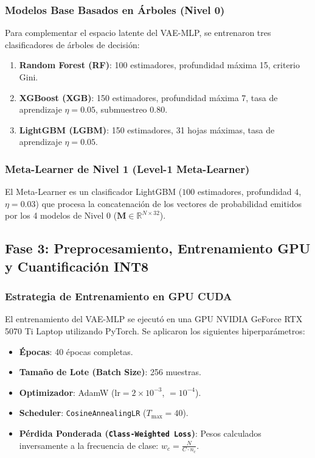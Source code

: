 \subsubsection{Modelos Base Basados en Árboles (Nivel 0)}
Para complementar el espacio latente del VAE-MLP, se entrenaron tres clasificadores de árboles de decisión:
\begin{enumerate}
    \item \textbf{Random Forest (RF)}: 100 estimadores, profundidad máxima 15, criterio Gini.
    \item \textbf{XGBoost (XGB)}: 150 estimadores, profundidad máxima 7, tasa de aprendizaje $\eta = 0.05$, submuestreo $0.80$.
    \item \textbf{LightGBM (LGBM)}: 150 estimadores, 31 hojas máximas, tasa de aprendizaje $\eta = 0.05$.
\end{enumerate}

\subsubsection{Meta-Learner de Nivel 1 (Level-1 Meta-Learner)}
El Meta-Learner es un clasificador LightGBM ($100$ estimadores, profundidad $4$, $\eta = 0.03$) que procesa la concatenación de los vectores de probabilidad emitidos por los 4 modelos de Nivel 0 ($\mathbf{M} \in \mathbb{R}^{N \times 32}$).

\subsection{Fase 3: Preprocesamiento, Entrenamiento GPU y Cuantificación INT8}

\subsubsection{Estrategia de Entrenamiento en GPU CUDA}
El entrenamiento del VAE-MLP se ejecutó en una GPU NVIDIA GeForce RTX 5070 Ti Laptop utilizando PyTorch. Se aplicaron los siguientes hiperparámetros:
\begin{itemize}
    \item \textbf{Épocas}: 40 épocas completas.
    \item \textbf{Tamaño de Lote (Batch Size)}: 256 muestras.
    \item \textbf{Optimizador}: AdamW ($\text{lr} = 2 \times 10^{-3}$,  $= 10^{-4}$).
    \item \textbf{Scheduler}: \texttt{CosineAnnealingLR} ($T_{\max} = 40$).
    \item \textbf{Pérdida Ponderada (\texttt{Class-Weighted Loss})}: Pesos calculados inversamente a la frecuencia de clase: $w_c = \frac{N}{C \cdot n_c}$.
\end{itemize}

